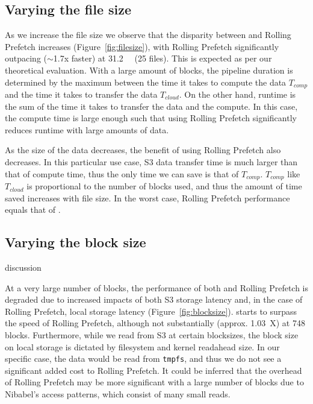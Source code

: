 \subsection{Varying the file size}
As we increase the file size we observe that the disparity between \sfs and
Rolling Prefetch increases (Figure~\ref{fig:filesize}), with Rolling Prefetch
significantly outpacing ($\sim$1.7x faster) \sfs at \SI{31.2}{\gibi\byte} (25
files). This is expected as per our theoretical evaluation. With a large amount
of blocks, the pipeline duration is determined by the maximum between the time
it takes to compute the data $T_{comp}$ and the time it takes to transfer the
data $T_{cloud}$. On the other hand, \sfs runtime is the sum of the time it
takes to transfer the data and the compute. In this case, the compute time is
large enough such that using Rolling Prefetch significantly reduces runtime with
large amounts of data.

As the size of the data decreases, the benefit of using Rolling Prefetch also
decreases. 
In this particular use case, S3 data transfer time is much larger than that of
compute time, thus the only time we can save is that of $T_{comp}$. $T_{comp}$
like ${T_{cloud}}$ is proportional to the number of blocks used, and thus the
amount of time saved increases with file size. In the worst case, Rolling
Prefetch performance equals that of \sfs.

\subsection{Varying the block size}%
discussion

At a very large number of blocks, the performance of both \sfs and Rolling
Prefetch is degraded due to increased impacts of both S3 storage latency and, in
the case of Rolling Prefetch, local storage latency
(Figure~\ref{fig:blocksize}).  \sfs starts to surpass the speed of Rolling
Prefetch, although not substantially (approx. 1.03~X) at 748 blocks.
Furthermore, while we read from S3 at certain blocksizes, the block size on
local storage is dictated by filesystem and kernel readahead size. In our
specific case, the data would be read from \texttt{tmpfs}, and thus we do not
see a significant added cost to Rolling Prefetch. It could be inferred that the
overhead of Rolling Prefetch may be more significant with a large number of
blocks due to Nibabel's access patterns, which consist of many small reads.

